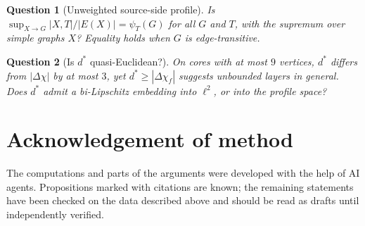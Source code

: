 \documentclass{article}
\newtheorem{question}{Question}
\begin{document}
\begin{question}[Unweighted source-side profile]
Is $\sup_{X\to G}|X,T|/|E(X)|=\psi_T(G)$ for all $G$ and $T$, with the
supremum over simple graphs $X$?  Equality holds when $G$ is
edge-transitive.
\end{question}

\begin{question}[Is $d^*$ quasi-Euclidean?]
On cores with at most $9$ vertices, $d^*$ differs from $|\Delta\chi|$ by
at most $3$, yet $d^*\ge|\Delta\chi_f|$ suggests unbounded layers in
general.  Does $d^*$ admit a bi-Lipschitz embedding into $\ell^2$, or into
the profile space?
\end{question}

\section*{Acknowledgement of method}
The computations and parts of the arguments were developed with the help
of AI agents.  Propositions marked with citations are known; the remaining
statements have been checked on the data described above and should be
read as drafts until independently verified.
\end{document}
